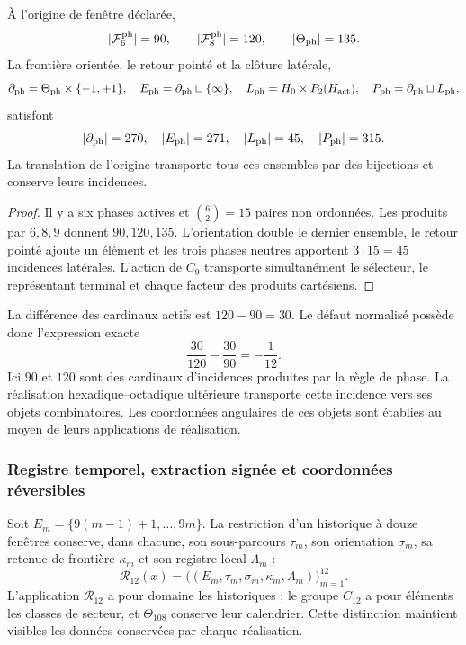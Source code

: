\begin{theorem}
\label{ii:tpk-semicorona}
À l'origine de fenêtre déclarée,
\[
 |\mathcal F_6^{\rm ph}|=90,\qquad
 |\mathcal F_8^{\rm ph}|=120,\qquad
 |\Theta_{\rm ph}|=135.
\]
La frontière orientée, le retour pointé et la clôture latérale,
\[
 \partial_{\rm ph}=\Theta_{\rm ph}\times\{-1,+1\},\quad
 E_{\rm ph}=\partial_{\rm ph}\sqcup\{\infty\},\quad
 L_{\rm ph}=H_0\times P_2(H_{\rm act}),\quad
 P_{\rm ph}=\partial_{\rm ph}\sqcup L_{\rm ph},
\]
satisfont
\[
 |\partial_{\rm ph}|=270,\quad |E_{\rm ph}|=271,\quad
 |L_{\rm ph}|=45,\quad |P_{\rm ph}|=315.
\]
La translation de l'origine transporte tous ces ensembles par des bijections et conserve leurs incidences.
\end{theorem}
\begin{proof}
Il y a six phases actives et \(\binom62=15\) paires non ordonnées. Les produits par \(6,8,9\) donnent \(90,120,135\). L'orientation double le dernier ensemble, le retour pointé ajoute un élément et les trois phases neutres apportent \(3\cdot15=45\) incidences latérales. L'action de \(C_9\) transporte simultanément le sélecteur, le représentant terminal et chaque facteur des produits cartésiens.
\end{proof}

La différence des cardinaux actifs est \(120-90=30\). Le défaut normalisé possède donc l'expression exacte
\begin{equation}
 \frac{30}{120}-\frac{30}{90}=-\frac1{12}.
 \label{ii:tpk-defecto-incidencia}
\end{equation}
Ici \(90\) et \(120\) sont des cardinaux d'incidences produites par la règle de phase. La réalisation hexadique--octadique ultérieure transporte cette incidence vers ses objets combinatoires. Les coordonnées angulaires de ces objets sont établies au moyen de leurs applications de réalisation.

\subsubsection{Registre temporel, extraction signée et coordonnées réversibles}

Soit \(E_m=\{9(m-1)+1,\ldots,9m\}\). La restriction d'un historique à douze fenêtres conserve, dans chacune, son sous-parcours \(\tau_m\), son orientation \(\sigma_m\), sa retenue de frontière \(\kappa_m\) et son registre local \(\Lambda_m\) :
\[
 \mathcal R_{12}(x)
 =\bigl((E_m,\tau_m,\sigma_m,\kappa_m,\Lambda_m)\bigr)_{m=1}^{12}.
\]
L'application \(\mathcal R_{12}\) a pour domaine les historiques ; le groupe \(C_{12}\) a pour éléments les classes de secteur, et \(\Theta_{108}\) conserve leur calendrier. Cette distinction maintient visibles les données conservées par chaque réalisation.

